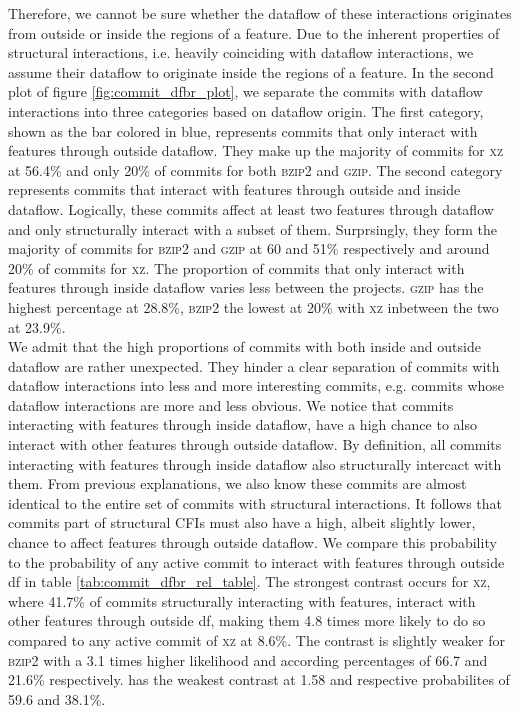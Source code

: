 Therefore, we cannot be sure whether the dataflow of these interactions originates from outside or inside the regions of a feature.
Due to the inherent properties of structural interactions, i.e. heavily coinciding with dataflow interactions, we assume their dataflow to originate inside the regions of a feature.
In the second plot of figure \ref{fig:commit_dfbr_plot}, we separate the commits with dataflow interactions into three categories based on dataflow origin.
The first category, shown as the bar colored in blue, represents commits that only interact with features through outside dataflow.
They make up the majority of commits for \textsc{xz} at 56.4\% and only 20\% of commits for both \textsc{bzip2} and \textsc{gzip}.
The second category represents commits that interact with features through outside and inside dataflow.
Logically, these commits affect at least two features through dataflow and only structurally interact with a subset of them.
Surprsingly, they form the majority of commits for \textsc{bzip2} and \textsc{gzip} at 60 and 51\% respectively and around 20\% of commits for \textsc{xz}.
The proportion of commits that only interact with features through inside dataflow varies less between the projects.
\textsc{gzip} has the highest percentage at 28.8\%, \textsc{bzip2} the lowest at 20\% with \textsc{xz} inbetween the two at 23.9\%. \\
We admit that the high proportions of commits with both inside and outside dataflow are rather unexpected.
They hinder a clear separation of commits with dataflow interactions into less and more interesting commits, e.g. commits whose dataflow interactions are more and less obvious.
We notice that commits interacting with features through inside dataflow, have a high chance to also interact with other features through outside dataflow.
By definition, all commits interacting with features through inside dataflow also structurally intercact with them.
From previous explanations, we also know these commits are almost identical to the entire set of commits with structural interactions.
It follows that commits part of structural CFIs must also have a high, albeit slightly lower, chance to affect features through outside dataflow.
We compare this probability to the probability of any active commit to interact with features through outside df in table \ref{tab:commit_dfbr_rel_table}.
The strongest contrast occurs for \textsc{xz}, where 41.7\% of commits structurally interacting with features, interact with other features through outside df, making them 4.8 times more likely to do so compared to any active commit of \textsc{xz} at 8.6\%.
The contrast is slightly weaker for \textsc{bzip2} with a 3.1 times higher likelihood and according percentages of 66.7 and 21.6\% respectively. 
 has the weakest contrast at 1.58 and respective probabilites of 59.6 and 38.1\%. 

